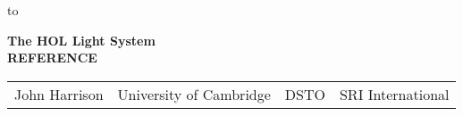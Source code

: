 

\begin{titlepage}
\null\vskip-47pt
\hbox to 

\setcounter{page}{1}                      %

\vspace*{60mm}


\begin{center}
 {\Huge\bf The HOL Light System}\\[0.4cm]
{\LARGE\bf REFERENCE}\\[2.5cm]
\end{center}

\vspace*{100mm}
\begin{center}
\begin{tabular}{cccc}
John Harrison & \hspace*{7ex} University of Cambridge & \hspace*{7ex}DSTO\hspace*{7ex} & SRI International
\end{tabular}
\end{center}

\vfill
\end{titlepage}

\thispagestyle{empty}
\mbox{}
\newpage

